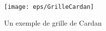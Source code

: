 \begin{figure}[h]
  \begin{center}
    \texttt{[image: eps/GrilleCardan]}
  \end{center}
  \caption{Un exemple de grille de Cardan}
  \label{fig:GrilleCardan}
\end{figure}





